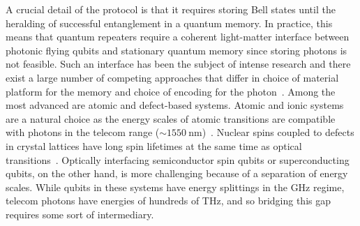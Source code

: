 A crucial detail of the protocol is that it requires storing Bell states until the heralding of successful entanglement in a quantum memory.
In practice, this means that quantum repeaters require a coherent light-matter interface between photonic flying qubits and stationary quantum memory since storing photons is not feasible.
Such an interface has been the subject of intense research and there exist a large number of competing approaches that differ in choice of material platform for the memory and choice of encoding for the photon~\cite{Awschalom2018,Beukers2024}.
Among the most advanced are atomic and defect-based systems.
Atomic and ionic systems are a natural choice as the energy scales of atomic transitions are compatible with photons in the telecom range ($\sim\qty{1550}{\nano\meter}$)~\cite{Sangouard2011,Krutyanskiy2023,Liu2024,Kucera2024}.
Nuclear spins coupled to defects in crystal lattices have long spin lifetimes at the same time as optical transitions~\cite{Togan2010,Nguyen2019,Bergeron2020,Stolk2024,Knaut2024}.
Optically interfacing semiconductor spin qubits or superconducting qubits, on the other hand, is more challenging because of a separation of energy scales.
While qubits in these systems have energy splittings in the \unit{\giga\hertz} regime, telecom photons have energies of hundreds of \unit{\tera\hertz}, and so bridging this gap requires some sort of intermediary.

\cite{Knaut2024,Liu2024,Kucera2024,Stolk2024} %